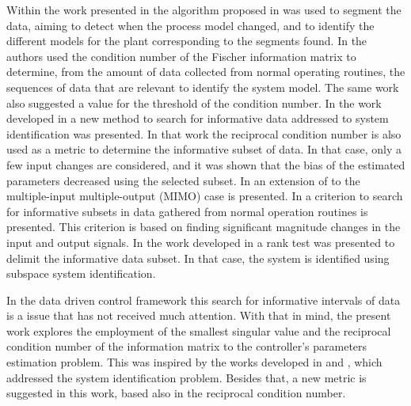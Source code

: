 \documentclass[letterpaper, 10 pt, conference]{ieeeconf}  %
\begin{document}
Within the work presented in \cite{shardt2014segmentation} the algorithm proposed in \cite{peretzki2011data} was used to segment the data, aiming to detect when the process model changed, and to identify the different models for the plant corresponding to the segments found.
In \cite{shardt2013data} the authors used the condition number of the Fischer information matrix to determine, from the amount of data collected from normal operating routines, the sequences of data that are relevant to identify the system model.
The same work also suggested a value for the threshold of the condition number.
In the work developed in \cite{arengas2017searching} a new method to search for informative data addressed to system identification was presented.
In that work the reciprocal condition number is also used as a metric to determine the informative subset of data.
In that case, only a few input changes are considered, and it was shown that the bias of the estimated parameters decreased using the selected subset.
In \cite{arengas2017search} an extension of \cite{arengas2017searching} to the multiple-input multiple-output (MIMO) case is presented.
In \cite{wang2018searching} a criterion to search for informative subsets in data gathered from normal operation routines is presented.
This criterion is based on finding significant magnitude changes in the input and output signals.
In the work developed in \cite{bitmead2017subspace} a rank test was presented to delimit the informative data subset.
In that case, the system is identified using subspace system identification.

In the data driven control framework this search for informative intervals of data is a issue that has not received much attention.
With that in mind, the present work explores the employment of the smallest singular value and the reciprocal condition number of the information matrix to the controller's parameters estimation problem.
This was inspired by the works developed in \cite{carrette1996discarding} and \cite{bittencourt2015algorithm}, which addressed the system identification problem.
Besides that, a new metric is suggested in this work, based also in the reciprocal condition number.
\end{document}
